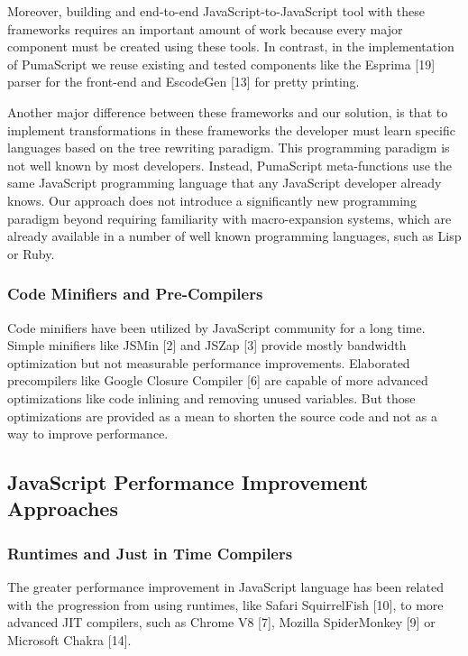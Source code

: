 \documentclass[preprint,10pt]{sigplanconf}
\begin{document}
Moreover, building and end-to-end JavaScript-to-JavaScript tool with these frameworks requires an important amount of work because every major component must be created using these tools. In contrast, in the implementation of PumaScript we reuse existing and tested components like the Esprima [19] parser for the front-end and EscodeGen [13] for pretty printing.

Another major difference between these frameworks and our solution, is that to implement transformations in these frameworks the developer must learn specific languages based on the tree rewriting paradigm. This programming paradigm is not well known by most developers. Instead, PumaScript meta-functions use the same JavaScript programming language that any JavaScript developer already knows. Our approach does not introduce a significantly new programming paradigm beyond requiring familiarity with macro-expansion systems, which are already available in a number of well known programming languages, such as Lisp or Ruby.

\subsubsection{Code Minifiers and Pre-Compilers}

Code minifiers have been utilized by JavaScript community for a long time. Simple minifiers like JSMin [2] and JSZap [3] provide mostly bandwidth optimization but not measurable performance improvements.
Elaborated precompilers like Google Closure Compiler [6] are capable of more advanced optimizations like code inlining and removing unused variables. But those optimizations are provided as a mean to shorten the source code and not as a way to improve performance.

\subsection{JavaScript Performance Improvement Approaches}

\subsubsection{Runtimes and Just in Time Compilers}

The greater performance improvement in JavaScript language has been related with the progression from using runtimes, like Safari SquirrelFish [10], to more advanced JIT compilers, such as Chrome V8 [7], Mozilla SpiderMonkey [9] or Microsoft Chakra [14]. 
\end{document}
